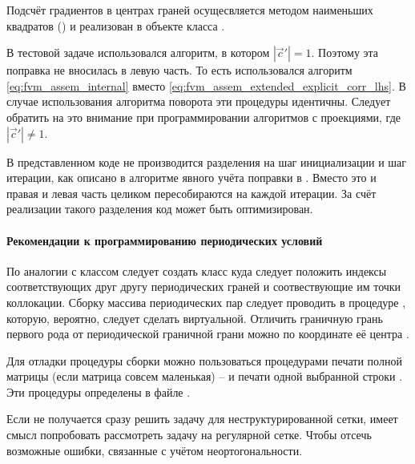 Подсчёт градиентов в центрах граней осущесвляется методом наименьших
квадратов () и реализован в объекте  класса .

В тестовой задаче использовался алгоритм, в котором $|\vec c'| = 1$.
Поэтому эта поправка не вносилась в левую часть. То есть использовался алгоритм
\cref{eq:fvm_assem_internal} вместо \cref{eq:fvm_assem_extended_explicit_corr_lhs}.
В случае использования алгоритма поворота эти процедуры идентичны.
Следует обратить на это внимание при программировании алгоритмов с проекциями, где $|\vec c'| \neq 1$.

В представленном коде не производится разделения на шаг инициализации и шаг итерации, как описано в алгоритме
явного учёта поправки в .
Вместо это и правая и левая часть целиком пересобираются на каждой итерации.
За счёт реализации такого разделения код может быть оптимизирован.

\paragraph{Рекомендации к программированию периодических условий}
По аналогии с классом  следует
создать класс  куда следует
положить индексы соответствующих друг другу периодических граней
и соотвествующие им точки коллокации.
Сборку массива периодических пар следует проводить в процедуре
, которую, вероятно, следует сделать виртуальной.
Отличить граничную грань первого рода от периодической граничной грани
можно по координате её центра .

Для отладки процедуры сборки можно
пользоваться процедурами печати полной матрицы (если матрица совсем маленькая)
--  и 
печати  одной выбранной строки .
Эти процедуры определены в файле .

Если не получается сразу решить задачу для неструктурированной сетки,
имеет смысл попробовать рассмотреть задачу на регулярной сетке. Чтобы отсечь возможные 
ошибки, связанные с учётом неортогональности.

